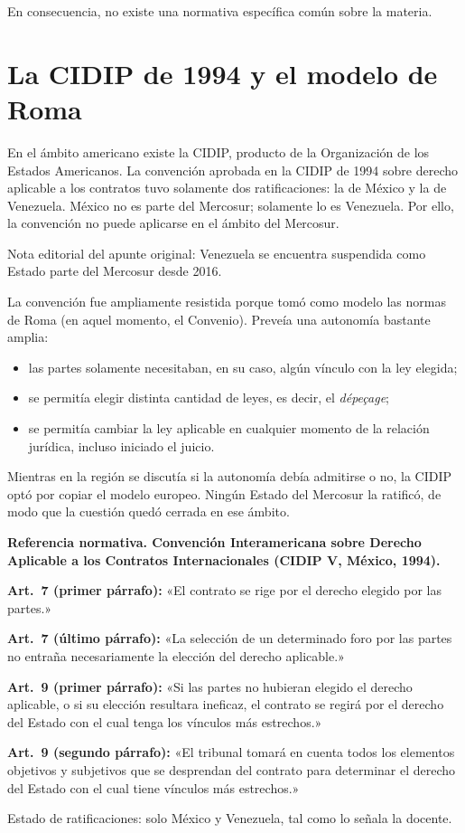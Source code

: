 \documentclass[12pt,oneside]{book}
\begin{document}
En consecuencia, no existe una normativa específica común sobre la materia.

\section{La CIDIP de 1994 y el modelo de Roma}

En el ámbito americano existe la CIDIP, producto de la Organización de los Estados Americanos. La convención aprobada en la CIDIP de 1994 sobre derecho aplicable a los contratos tuvo solamente dos ratificaciones: la de México y la de Venezuela. México no es parte del Mercosur; solamente lo es Venezuela. Por ello, la convención no puede aplicarse en el ámbito del Mercosur.

\begin{note}
Nota editorial del apunte original: Venezuela se encuentra suspendida como Estado parte del Mercosur desde 2016.
\end{note}

La convención fue ampliamente resistida porque tomó como modelo las normas de Roma (en aquel momento, el Convenio). Preveía una autonomía bastante amplia:

\begin{itemize}
    \item las partes solamente necesitaban, en su caso, algún vínculo con la ley elegida;
    \item se permitía elegir distinta cantidad de leyes, es decir, el \textit{dépeçage};
    \item se permitía cambiar la ley aplicable en cualquier momento de la relación jurídica, incluso iniciado el juicio.
\end{itemize}

Mientras en la región se discutía si la autonomía debía admitirse o no, la CIDIP optó por copiar el modelo europeo. Ningún Estado del Mercosur la ratificó, de modo que la cuestión quedó cerrada en ese ámbito.

\begin{note}
\textbf{Referencia normativa. Convención Interamericana sobre Derecho Aplicable a los Contratos Internacionales (CIDIP V, México, 1994).}

\textbf{Art.\ 7 (primer párrafo):} «El contrato se rige por el derecho elegido por las partes.»

\textbf{Art.\ 7 (último párrafo):} «La selección de un determinado foro por las partes no entraña necesariamente la elección del derecho aplicable.»

\textbf{Art.\ 9 (primer párrafo):} «Si las partes no hubieran elegido el derecho aplicable, o si su elección resultara ineficaz, el contrato se regirá por el derecho del Estado con el cual tenga los vínculos más estrechos.»

\textbf{Art.\ 9 (segundo párrafo):} «El tribunal tomará en cuenta todos los elementos objetivos y subjetivos que se desprendan del contrato para determinar el derecho del Estado con el cual tiene vínculos más estrechos.»

Estado de ratificaciones: solo México y Venezuela, tal como lo señala la docente.
\end{note}
\end{document}
